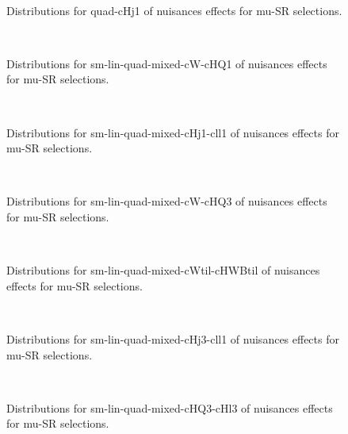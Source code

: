 \begin{figure}[htbp]  
\centering 
\\ 
\caption{ 
   Distributions for quad-cHj1 of nuisances effects for mu-SR selections.
} 
\label{fig:quad_cHj1_mu_SR} 
\end{figure} 




\begin{figure}[htbp]  
\centering 
\\ 
\caption{ 
   Distributions for sm-lin-quad-mixed-cW-cHQ1 of nuisances effects for mu-SR selections.
} 
\label{fig:sm_lin_quad_mixed_cW_cHQ1_mu_SR} 
\end{figure} 




\begin{figure}[htbp]  
\centering 
\\ 
\caption{ 
   Distributions for sm-lin-quad-mixed-cHj1-cll1 of nuisances effects for mu-SR selections.
} 
\label{fig:sm_lin_quad_mixed_cHj1_cll1_mu_SR} 
\end{figure} 




\begin{figure}[htbp]  
\centering 
\\ 
\caption{ 
   Distributions for sm-lin-quad-mixed-cW-cHQ3 of nuisances effects for mu-SR selections.
} 
\label{fig:sm_lin_quad_mixed_cW_cHQ3_mu_SR} 
\end{figure} 




\begin{figure}[htbp]  
\centering 
\\ 
\caption{ 
   Distributions for sm-lin-quad-mixed-cWtil-cHWBtil of nuisances effects for mu-SR selections.
} 
\label{fig:sm_lin_quad_mixed_cWtil_cHWBtil_mu_SR} 
\end{figure} 




\begin{figure}[htbp]  
\centering 
\\ 
\caption{ 
   Distributions for sm-lin-quad-mixed-cHj3-cll1 of nuisances effects for mu-SR selections.
} 
\label{fig:sm_lin_quad_mixed_cHj3_cll1_mu_SR} 
\end{figure} 




\begin{figure}[htbp]  
\centering 
\\ 
\caption{ 
   Distributions for sm-lin-quad-mixed-cHQ3-cHl3 of nuisances effects for mu-SR selections.
} 
\label{fig:sm_lin_quad_mixed_cHQ3_cHl3_mu_SR} 
\end{figure} 




